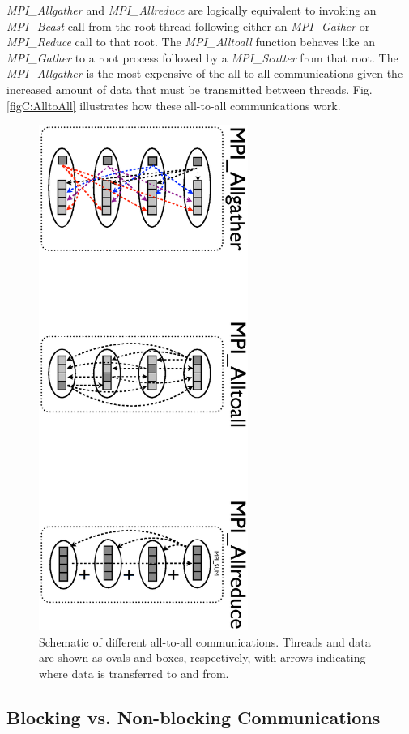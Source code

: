 \emph{MPI\_Allgather} and \emph{MPI\_Allreduce} are logically equivalent to
invoking an \emph{MPI\_Bcast} call from the root thread following either an
\emph{MPI\_Gather} or \emph{MPI\_Reduce} call to that root. The
\emph{MPI\_Alltoall} function behaves like an \emph{MPI\_Gather} to a root
process followed by a \emph{MPI\_Scatter} from that root. The
\emph{MPI\_Allgather} is the most expensive of the all-to-all communications
given the increased amount of data that must be transmitted between threads.
Fig. \ref{figC:AlltoAll} illustrates how these all-to-all communications work.

\begin{figure}
   \includegraphics[height=6.5in, angle=90]{AllToAll.ps}
   \caption{Schematic of different all-to-all communications. Threads and data
            are shown as ovals and boxes, respectively, with arrows indicating
            where data is transferred to and from.}
   \label{figC:AllToAll}
\end{figure}

\subsection{Blocking vs. Non-blocking Communications}

